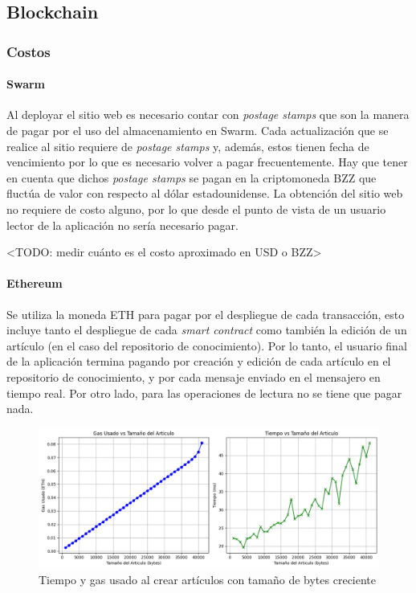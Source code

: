 \subsection{Blockchain}

\subsubsection{Costos}

\paragraph{Swarm}
Al deployar el sitio web es necesario contar con \textit{postage stamps} que son la manera de pagar por el uso del almacenamiento en Swarm. Cada actualización que se realice al sitio requiere de \textit{postage stamps} y, además, estos tienen fecha de vencimiento por lo que es necesario volver a pagar frecuentemente. Hay que tener en cuenta que dichos \textit{postage stamps} se pagan en la criptomoneda BZZ que fluctúa de valor con respecto al dólar estadounidense. La obtención del sitio web no requiere de costo alguno, por lo que desde el punto de vista de un usuario lector de la aplicación no sería necesario pagar.

<TODO: medir cuánto es el costo aproximado en USD o BZZ>

\paragraph{Ethereum}
Se utiliza la moneda ETH para pagar por el despliegue de cada transacción, esto incluye tanto el despliegue de cada \textit{smart contract} como también la edición de un artículo (en el caso del repositorio de conocimiento). Por lo tanto, el usuario final de la aplicación termina pagando por creación y edición de cada artículo en el repositorio de conocimiento, y por cada mensaje enviado en el mensajero en tiempo real. Por otro lado, para las operaciones de lectura no se tiene que pagar nada.

\begin{figure}[H]
    \centering
    \includegraphics[width=1\linewidth]{img/aw-eth-bytes-articulo-incremental.png}
    \caption{Tiempo y gas usado al crear artículos con tamaño de bytes creciente}
    \label{fig:aw-eth-bytes-articulo-incremental.png}
\end{figure}

